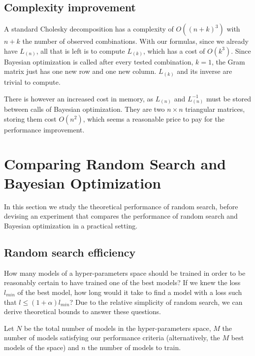 \subsection{Complexity improvement}
\label{ssec:complexity}

A standard Cholesky decomposition has a complexity of $O \left( (n + k)^3 \right)$ with $n + k$ the number of observed combinations. With our formulas, since we already have $L_{(n)}$, all that is left is to compute $L_{(k)}$, which has a cost of $O \left( k^3 \right)$. Since Bayesian optimization is called after every tested combination, $k = 1$, the Gram matrix just has one new row and one new column. $L_{(k)}$ and its inverse are trivial to compute.

There is however an increased cost in memory, as $L_{(n)}$ and $L_{(n)}^{-1}$ must be stored between calls of Bayesian optimization. They are two $n \times n$ triangular matrices, storing them cost $O \left( n^2 \right)$, which seems a reasonable price to pay for the performance improvement.

\section{Comparing Random Search and Bayesian Optimization}
\label{sec:compare}

In this section we study the theoretical performance of random search, before devising an experiment that compares the performance of random search and Bayesian optimization in a practical setting.

\subsection{Random search efficiency}
\label{ssec:random}

How many models of a hyper-parameters space should be trained in order to be reasonably certain to have trained one of the best models? If we knew the loss $l_{min}$ of the best model, how long would it take to find a model with a loss such that $l \leq (1 + \alpha) l_{min}$? Due to the relative simplicity of random search, we can derive theoretical bounds to answer these questions.

Let $N$ be the total number of models in the hyper-parameters space, $M$ the number of models satisfying our performance criteria (alternatively, the $M$ best models of the space) and $n$ the number of models to train.

